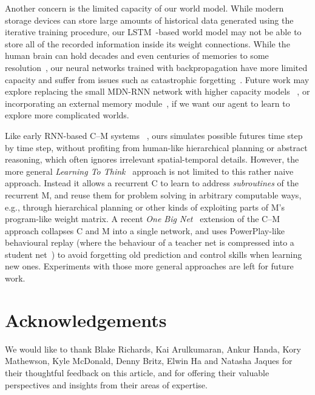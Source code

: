 \documentclass{article}
\begin{document}
Another concern is the limited capacity of our world model. While modern storage devices can store large amounts of historical data generated using the iterative training procedure, our LSTM~\cite{lstm,s12_lstm_forget}-based world model may not be able to store all of the recorded information inside its weight connections. While the human brain can hold decades and even centuries of memories to some resolution~\cite{brain_capacity}, our neural networks trained with backpropagation have more limited capacity and suffer from issues such as catastrophic forgetting~\cite{Ratcliff1990,French1994,Kirkpatrick2016}. Future work may explore replacing the small MDN-RNN network with higher capacity models ~\cite{outrageously_large_neural_nets,hypernetworks,suarez2017,wavenet,attention}, or incorporating an external memory module~\cite{Gemici2017}, if we want our agent to learn to explore more complicated worlds.

Like early RNN-based C--M systems ~\cite{s05_making_the_world_differentiable,s05a_cm,s05b_rl,s05c_boredom}, ours simulates possible futures time step by time step, without profiting from human-like hierarchical planning or abstract reasoning, which often ignores irrelevant spatial-temporal details. However, the more general \textit{Learning To Think}~\cite{learning_to_think} approach is not limited to this rather naive approach. Instead it allows a recurrent C to learn to address \textit{subroutines} of the recurrent M, and reuse them for problem solving in arbitrary computable ways, e.g., through hierarchical planning or other kinds of exploiting parts of M's program-like weight matrix. A recent \textit{One Big Net}~\cite{onebignet2018} extension of the C--M approach
collapses C and M into a single network, and uses PowerPlay-like~\cite{s10_powerplay,s11_powerplay} behavioural replay (where the behaviour of a teacher net is compressed into a student net~\cite{chunker91and92}) to avoid forgetting old prediction and control skills when learning new ones. Experiments with those more general approaches are left for future work.

\section*{Acknowledgements}

We would like to thank Blake Richards, Kai Arulkumaran, Ankur Handa, Kory Mathewson, Kyle McDonald, Denny Britz, Elwin Ha and Natasha Jaques for their thoughtful feedback on this article, and for offering their valuable perspectives and insights from their areas of expertise.
\end{document}
